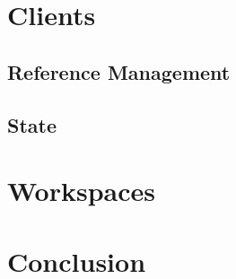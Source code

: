 \documentclass[conference]{IEEEtran}
\begin{document}
\section{Clients}
{ \textcolor{gray}\blindtext }

\subsection{Reference Management}
{ \textcolor{gray}\blindtext }

\subsection{State}
{ \textcolor{gray}\blindtext }

\section{Workspaces}
{ \textcolor{gray}\blindtext }

\section{Conclusion}
{ \textcolor{gray}\blindtext }

\begin{thebibliography}{00}
 { \textcolor{gray}\blindtext }
\end{thebibliography}
\end{document}

